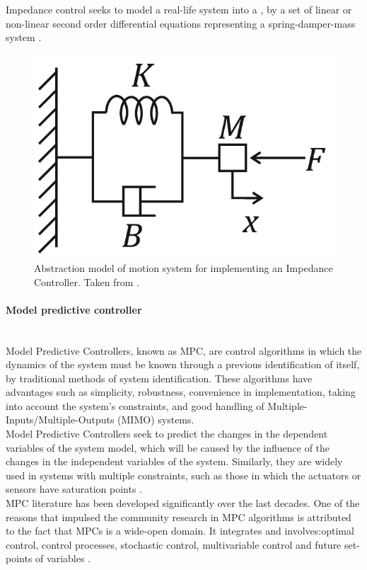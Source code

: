 \documentclass[11pt]{report} %
\newcommand{\subsubsubsection}[1]{\paragraph{#1}\mbox{}\\}
\begin{document}
Impedance control seeks to model a real-life system into a , by a set of linear or non-linear second order differential equations representing a spring-damper-mass system \citep{cite_canudas_theory_of_robotic_control}.\\

\begin{figure}[H]
    \centering
    \includegraphics[width=0.4\linewidth]{assets/imgs/reference_framework/mass_damper_mass_system_for_impedance_control.png}
    \caption{Abstraction model of motion system for implementing an Impedance Controller. Taken from \citep{cite_mass_spring_damper_system_ic}.} 
    \label{fig_mass_spring_damper_system}
\end{figure}


\subsubsubsection{Model predictive controller}

Model Predictive Controllers, known as MPC, are control algorithms in which the dynamics of the system must be known through a previous identification of itself, by traditional methods of system identification. These algorithms have advantages such as simplicity, robustness, convenience in implementation, taking into account the system's constraints, and good handling of Multiple-Inputs/Multiple-Outputs (MIMO) systems.\\

Model Predictive Controllers seek to predict the changes in the dependent variables of the system model, which will be caused by the influence of the changes in the independent variables of the system. Similarly, they are widely used in systems with multiple constraints, such as those in which the actuators or sensors have saturation points \citep{cite_mpc_industrial_processes_automation_systems}.\\

MPC literature has been developed significantly over the last decades. One of the reasons that impulsed the community research in MPC algorithms is attributed to the fact that MPCs is a wide-open domain. It integrates and involves:optimal control, control processes, stochastic control, multivariable control and future set-points of variables \citep{cite_model_predictive_control_camacho_bordons}.\\ 
\end{document}
